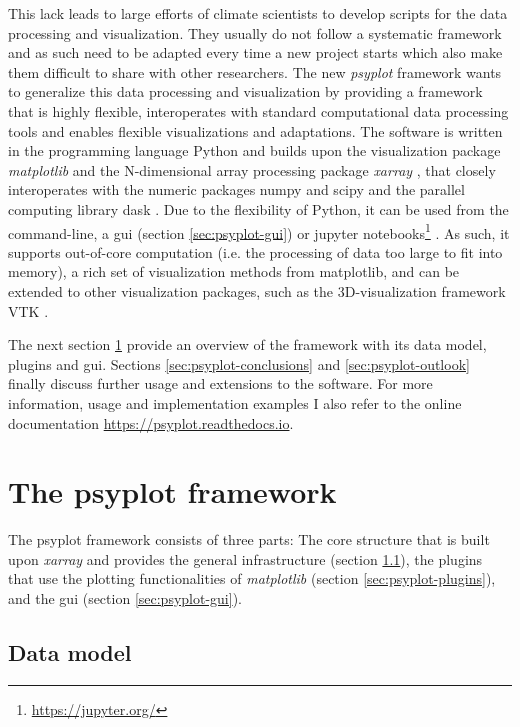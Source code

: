\begin{refsection}
This lack leads to large efforts of climate scientists to develop scripts for the data processing and visualization. They usually do not follow a systematic framework and as such need to be adapted every time a new project starts which also make them difficult to share with other researchers. The new \textit{psyplot} framework wants to generalize this data processing and visualization by providing a framework that is highly flexible, interoperates with standard computational data processing tools and enables flexible visualizations and adaptations. The software is written in the programming language Python \citep{PerezGrangerHunter2011} and builds upon the visualization package \textit{matplotlib} \citep{Hunter2007} and the N-dimensional array processing package \textit{xarray} \citep{HoyerHamman2017}, that closely interoperates with the numeric packages numpy and scipy \citep{JonesOliphantPetersonEtAl2001, Oliphant2006} and the parallel computing library dask \citep{DDT2016}. Due to the flexibility of Python, it can be used from the command-line, a \gls{gui} (section \ref{sec:psyplot-gui}) or jupyter notebooks\footnote{\url{https://jupyter.org/}} \citep{KluyverRaganKelleyPerezEtAl2016}. As such, it supports out-of-core computation (i.e. the processing of data too large to fit into memory), a rich set of visualization methods from matplotlib, and can be extended to other visualization packages, such as the 3D-visualization framework VTK \citep{Sommer2019a}.

The next section \ref{sec:psyplot-framework} provide an overview of the framework with its data model, plugins and \gls{gui}. Sections \ref{sec:psyplot-conclusions} and \ref{sec:psyplot-outlook} finally discuss further usage and extensions to the software. For more information, usage and implementation examples I also refer to the online documentation \url{https://psyplot.readthedocs.io}.

\section{The psyplot framework}  \label{sec:psyplot-framework}

The psyplot framework consists of three parts: The core structure that is built upon \textit{xarray} and provides the general infrastructure (section \ref{sec:psyplot-model}), the plugins that use the plotting functionalities of \textit{matplotlib} (section \ref{sec:psyplot-plugins}), and the \gls{gui} (section \ref{sec:psyplot-gui}).


\subsection{Data model}  \label{sec:psyplot-model}


\end{refsection}
